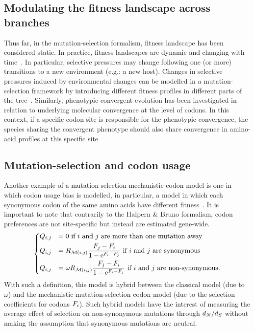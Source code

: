 \subsection{Modulating the fitness landscape across branches}
\label{subsec:modulating-the-fitness-landscape-across-branches}

Thus far, in the mutation-selection formalism, fitness landscape has been considered static.
In practice, fitness landscapes are dynamic and changing with time~\citep{Naumenko2012, Bazykin2015}.
In particular, selective pressures may change following one (or more) transitions to a new environment (e.g.: a new host).
Changes in selective pressures induced by environmental changes can be modelled in a mutation-selection framework by introducing different fitness profiles in different parts of the tree~\citep{Tamuri2009}.
Similarly, phenotypic convergent evolution has been investigated in relation to underlying molecular convergence at the level of codons.
In this context, if a specific codon site is responsible for the phenotypic convergence, the species sharing the convergent phenotype should also share convergence in amino-acid profiles at this specific site~\citep{Parto2018,Parto2018a}

\subsection{Mutation-selection and codon usage}
\label{subsec:model-codon-usage}

Another example of a mutation-selection mechanistic codon model is one in which codon usage bias is modelled, in particular, a model in which each synonymous codon of the same amino acids have different fitness~\citep{Yang2008}.
It is important to note that contrarily to the Halpern \& Bruno formalism, codon preferences are not site-specific but instead are estimated gene-wide.
\begin{equation}
    \begin{dcases}
        Q_{{i}, {j}} & = 0 \text{ if ${i}$ and ${j}$ are more than one mutation away} \\
        Q_{{i}, {j}} & = R_{\mathcal{M}({i}, {j})} \dfrac{F_{{j}} - F_{{i}}}{1 - \text{e}^{F_{{i}} - F_{{j}}} }\text{ if ${i}$ and ${j}$ are synonymous} \\
        Q_{{i}, {j}} & = \omega R_{\mathcal{M}({i}, {j})} \dfrac{F_{{j}} - F_{{i}}}{1 - \text{e}^{F_{{i}} - F_{{j}}} } \text{ if ${i}$ and ${j}$ are non-synonymous}.
    \end{dcases}
    \label{eq:yang-codon-models}
\end{equation}
With such a definition, this model is hybrid between the classical model (due to $\omega$) and the mechanistic mutation-selection codon model (due to the selection coefficients for codons $F_{{i}}$).
Such hybrid models have the interest of measuring the average effect of selection on non-synonymous mutations through $d_N / d_S$ without making the assumption that synonymous mutations are neutral.


